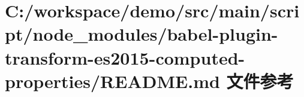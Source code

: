 \hypertarget{node__modules_2babel-plugin-transform-es2015-computed-properties_2_r_e_a_d_m_e_8md}{}\section{C\+:/workspace/demo/src/main/script/node\+\_\+modules/babel-\/plugin-\/transform-\/es2015-\/computed-\/properties/\+R\+E\+A\+D\+ME.md 文件参考}
\label{node__modules_2babel-plugin-transform-es2015-computed-properties_2_r_e_a_d_m_e_8md}
